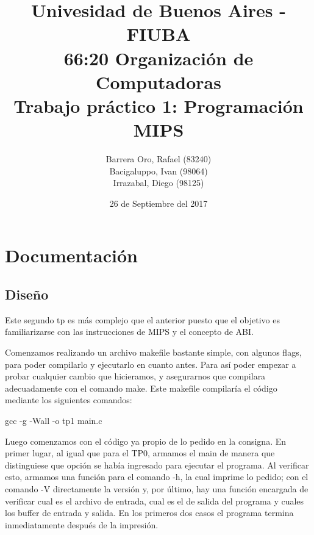 \documentclass[10pt,a4paper]{article}
\begin{document}
\date{26 de Septiembre del 2017}

\title{Univesidad de Buenos Aires - FIUBA \\ 66:20 Organización de Computadoras \\ Trabajo práctico 1: Programación MIPS}

\author{Barrera Oro, Rafael (83240) \\ Bacigaluppo, Ivan (98064) \\ Irrazabal, Diego (98125)}

\maketitle

\thispagestyle{empty}

\newpage

\setcounter{page}{1}

\tableofcontents

\newpage

\section{Documentación}

\subsection{Diseño}

Este segundo tp es más complejo que el anterior puesto que el objetivo es familiarizarse con las instrucciones de MIPS y el concepto de ABI.

Comenzamos realizando un archivo makefile bastante simple, con algunos flags, para poder compilarlo y ejecutarlo en cuanto antes. Para así poder empezar a probar cualquier cambio que hicieramos, y asegurarnos que compilara adecuadamente con el comando make. Este makefile compilaría el código mediante los siguientes comandos:

	gcc -g -Wall -o tp1 main.c

Luego comenzamos con el código ya propio de lo pedido en la consigna. En primer lugar, al igual que para el TP0, armamos el main de manera que distinguiese que opción se había ingresado para ejecutar el programa. Al verificar esto, armamos una función para el comando -h, la cual imprime lo pedido; con el comando -V directamente la versión y, por último, hay una función encargada de verificar cual es el archivo de entrada, cual es el de salida del programa y cuales los buffer de entrada y salida. En los primeros dos casos el programa termina inmediatamente después de la impresión.
\end{document}
